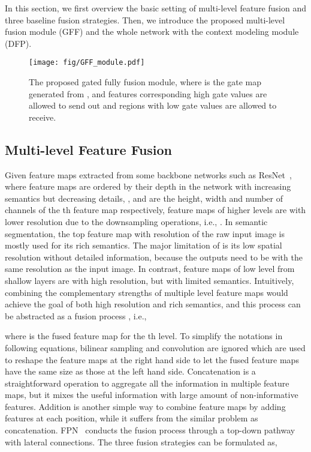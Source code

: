 \documentclass[letterpaper]{article} \usepackage{aaai20}  \usepackage{times}  \usepackage{helvet} \usepackage{courier}  \usepackage[hyphens]{url}  \usepackage{graphicx} \urlstyle{rm} \def\UrlFont{\rm}  \usepackage{graphicx}  \usepackage{amsmath}
\begin{document}
In this section, we first overview the basic setting of multi-level feature fusion and three baseline fusion strategies. Then, we introduce the proposed multi-level fusion module (GFF) and the whole network with the context modeling module (DFP).

\begin{figure}
\centering
\texttt{[image: fig/GFF\_module.pdf]}
\caption{\footnotesize The proposed gated fully fusion module,  where  is the gate map generated from , and features corresponding high gate values are allowed to send out and regions with low gate values are allowed to receive.}
\label{fig:fusion}
\end{figure}

\subsection{Multi-level Feature Fusion}
\label{sec:fusionreview}
  Given  feature maps  extracted from some backbone networks such as ResNet~\cite{resnet}, where feature maps are ordered by their depth in the network with increasing semantics but decreasing details, ,  and  are the height, width and number of channels of the th feature map respectively, feature maps of higher levels are with lower resolution due to the downsampling operations, i.e., . In semantic segmentation, the top feature map  with  resolution of the raw input image is mostly used for its rich semantics. The major limitation of  is its low spatial resolution without detailed information, because the outputs need to be with the same resolution as the input image. In contrast, feature maps of low level from shallow layers are with high resolution, but with limited semantics. Intuitively, combining the complementary strengths of multiple level feature maps would achieve the goal of both high resolution and rich semantics, and this process can be abstracted as a fusion process , i.e.,
  
where  is the fused feature map for the th level. To simplify the notations in following equations, bilinear sampling and  convolution are ignored which are used to reshape the feature maps at the right hand side to let the fused feature maps have the same size as those at the left hand side. Concatenation is a straightforward operation to aggregate all the information in multiple feature maps, but it mixes the useful information with large amount of non-informative features. Addition is another simple way to combine feature maps by adding features at each position, while it suffers from the similar problem as concatenation. FPN~\cite{fpn} conducts the fusion process through a top-down pathway with lateral connections. The three fusion strategies can be formulated as,
    
\end{document}

